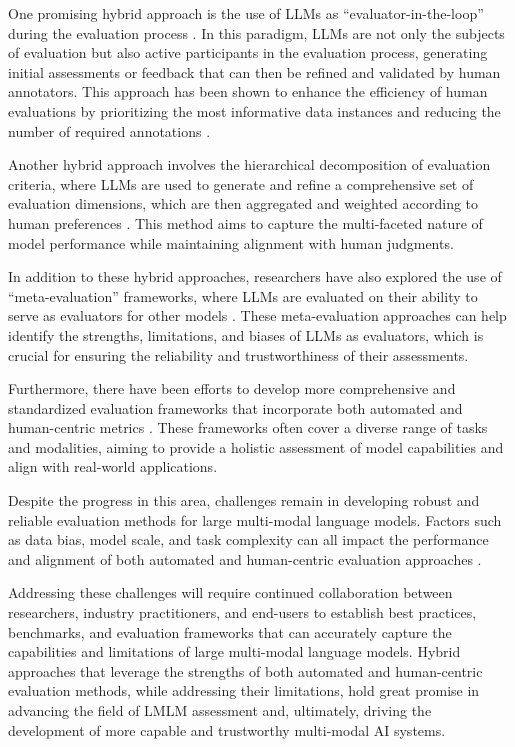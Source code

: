 \documentclass[11pt]{article}
\begin{document}
One promising hybrid approach is the use of LLMs as ``evaluator-in-the-loop'' during the evaluation process \cite{ref167}. In this paradigm, LLMs are not only the subjects of evaluation but also active participants in the evaluation process, generating initial assessments or feedback that can then be refined and validated by human annotators. This approach has been shown to enhance the efficiency of human evaluations by prioritizing the most informative data instances and reducing the number of required annotations \cite{ref170}.

Another hybrid approach involves the hierarchical decomposition of evaluation criteria, where LLMs are used to generate and refine a comprehensive set of evaluation dimensions, which are then aggregated and weighted according to human preferences \cite{ref168}. This method aims to capture the multi-faceted nature of model performance while maintaining alignment with human judgments.

In addition to these hybrid approaches, researchers have also explored the use of ``meta-evaluation'' frameworks, where LLMs are evaluated on their ability to serve as evaluators for other models \cite{ref60}. These meta-evaluation approaches can help identify the strengths, limitations, and biases of LLMs as evaluators, which is crucial for ensuring the reliability and trustworthiness of their assessments.

Furthermore, there have been efforts to develop more comprehensive and standardized evaluation frameworks that incorporate both automated and human-centric metrics \cite{ref150,ref171}. These frameworks often cover a diverse range of tasks and modalities, aiming to provide a holistic assessment of model capabilities and align with real-world applications.

Despite the progress in this area, challenges remain in developing robust and reliable evaluation methods for large multi-modal language models. Factors such as data bias, model scale, and task complexity can all impact the performance and alignment of both automated and human-centric evaluation approaches \cite{ref172,ref173}.

Addressing these challenges will require continued collaboration between researchers, industry practitioners, and end-users to establish best practices, benchmarks, and evaluation frameworks that can accurately capture the capabilities and limitations of large multi-modal language models. Hybrid approaches that leverage the strengths of both automated and human-centric evaluation methods, while addressing their limitations, hold great promise in advancing the field of LMLM assessment and, ultimately, driving the development of more capable and trustworthy multi-modal AI systems.
\end{document}
